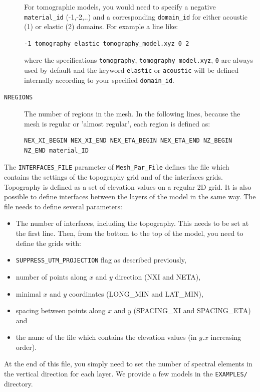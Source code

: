 \begin{description}
\noindent
For tomographic models, you would need to specify a negative \texttt{material\_id} (-1,-2,..)
and a corresponding \texttt{domain\_id} for either acoustic (1) or elastic (2) domains. For example a line like:
{\small
\begin{verbatim}
-1 tomography elastic tomography_model.xyz 0 2
\end{verbatim}
}
where the specifications \texttt{tomography}, \texttt{tomography\_model.xyz}, \texttt{0} are always used by default and
the keyword \texttt{elastic} or \texttt{acoustic} will be defined internally according to your specified \texttt{domain\_id}.
%
\item [{\texttt{NREGIONS}}] The number of regions in the mesh. In the following
lines, because the mesh is regular or 'almost regular', each region
is defined as:
{\small
\begin{verbatim}
NEX_XI_BEGIN NEX_XI_END NEX_ETA_BEGIN NEX_ETA_END NZ_BEGIN NZ_END material_ID
\end{verbatim}
}
\end{description}
%
The \texttt{INTERFACES\_FILE} parameter of \texttt{Mesh\_Par\_File}
defines the file which contains the settings of the topography grid
and of the interfaces grids. Topography is defined as a set of elevation
values on a regular 2D grid. It is also possible to define interfaces
between the layers of the model in the same way. The file needs to
define several parameters:
\begin{itemize}
\item The number of interfaces, including the topography. This needs to
be set at the first line. Then, from the bottom to the top of the
model, you need to define the grids with:
\item \texttt{SUPPRESS\_UTM\_PROJECTION} flag as described previously,
\item number of points along $x$ and $y$ direction (NXI and NETA),
\item minimal $x$ and $y$ coordinates (LONG\_MIN and LAT\_MIN),
\item spacing between points along $x$ and $y$ (SPACING\_XI and SPACING\_ETA)
and
\item the name of the file which contains the elevation values (in $y$.$x$
increasing order).
\end{itemize}
%
At the end of this file, you simply need to set the number of spectral
elements in the vertical direction for each layer. We provide a few
models in the {\texttt{EXAMPLES/}} directory.\\

